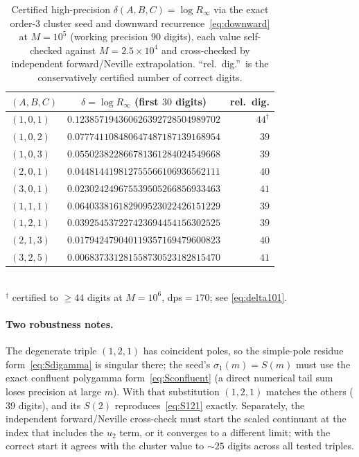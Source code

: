 \documentclass[11pt]{article}
\newcommand{\Rinf}{R_\infty}
\begin{document}
\begin{table}[t]
\centering
\caption{Certified high-precision $\delta(A,B,C)=\log\Rinf$ via the exact
order-$3$ cluster seed and downward recurrence~\eqref{eq:downward} at $M=10^5$
(working precision $90$ digits), each value self-checked against $M=2.5\times10^4$
and cross-checked by independent forward/Neville extrapolation. ``rel.\ dig.''\ is
the conservatively certified number of correct digits.}\label{tab:hp}
\begin{tabular}{lcr}
\toprule
$(A,B,C)$ & $\delta=\log\Rinf$ (first $30$ digits) & rel.\ dig.\\
\midrule
$(1,0,1)$ & $0.123857194360626392728504989702$ & $44^{\dagger}$\\
$(1,0,2)$ & $0.077741108480647487187139168954$ & $39$\\
$(1,0,3)$ & $0.055023822866781361284024549668$ & $39$\\
$(2,0,1)$ & $0.044814419812755566106936562111$ & $40$\\
$(3,0,1)$ & $0.023024249675539505266856933463$ & $41$\\
$(1,1,1)$ & $0.064033816182909523022426151229$ & $39$\\
$(1,2,1)$ & $0.039254537227423694454156302525$ & $39$\\
$(2,1,3)$ & $0.017942479040119357169479600823$ & $40$\\
$(3,2,5)$ & $0.006837331281558730523182815470$ & $41$\\
\bottomrule
\end{tabular}\\[2pt]
{\footnotesize $^{\dagger}$ certified to $\ge44$ digits at $M=10^6$, dps$=170$; see
\eqref{eq:delta101}.}
\end{table}

\paragraph{Two robustness notes.} The degenerate triple $(1,2,1)$ has coincident
poles, so the simple-pole residue form~\eqref{eq:Sdigamma} is singular there; the
seed's $\sigma_1(m)=S(m)$ must use the exact confluent polygamma
form~\eqref{eq:Sconfluent} (a direct numerical tail sum loses precision at large
$m$). With that substitution $(1,2,1)$ matches the others ($39$ digits), and its
$S(2)$ reproduces~\eqref{eq:S121} exactly. Separately, the independent
forward/Neville cross-check must start the scaled continuant at the index that
includes the $u_2$ term, or it converges to a different limit; with the correct
start it agrees with the cluster value to $\sim25$ digits across all tested triples.
\end{document}
